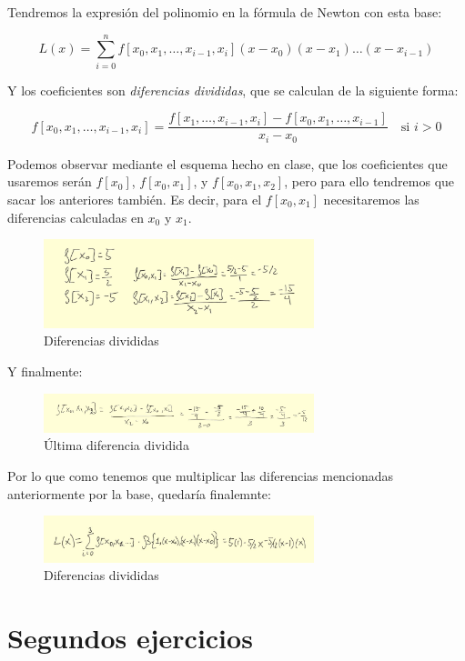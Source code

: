 \documentclass{article}
\begin{document}
Tendremos la expresión del polinomio en la fórmula de Newton con esta base:

\begin{equation}
L(x) = \sum_{i=0}^{n} f[x_0, x_1, \dots, x_{i-1}, x_i](x - x_0)(x - x_1) \dots (x - x_{i-1})
\end{equation}

Y los coeficientes son \textit{diferencias divididas}, que se calculan de la siguiente forma:

\begin{equation}
f[x_0, x_1, \dots, x_{i-1}, x_i] = \frac{f[x_1, \dots, x_{i-1}, x_i] - f[x_0, x_1, \dots, x_{i-1}]}{x_i - x_0} \quad \text{si } i > 0 
\end{equation}

Podemos observar mediante el esquema hecho en clase, que los coeficientes que usaremos serán $f[x_0]$, $f[x_0,x_1]$, y $f[x_0, x_1, x_2]$, pero para ello tendremos que sacar los anteriores también. Es decir, para el $f[x_0, x_1]$ necesitaremos las diferencias calculadas en $x_0$ y $x_1$.

\begin{figure}[h]
  \center
  \includegraphics[width=0.7\textwidth]{src/fxnewton.jpg}
  \caption{Diferencias divididas}
\end{figure}

Y finalmente:

\begin{figure}[h]
  \center
  \includegraphics[width=0.7\textwidth]{src/f012newton.jpg}
  \caption{Última diferencia dividida}
\end{figure}

Por lo que como tenemos que multiplicar las diferencias mencionadas anteriormente por la base, quedaría finalemnte:

\begin{figure}[h]
  \center
  \includegraphics[width=0.7\textwidth]{src/newtonsol1.jpg}
  \caption{Diferencias divididas}
\end{figure}

\newpage

\section{Segundos ejercicios}
\end{document}
